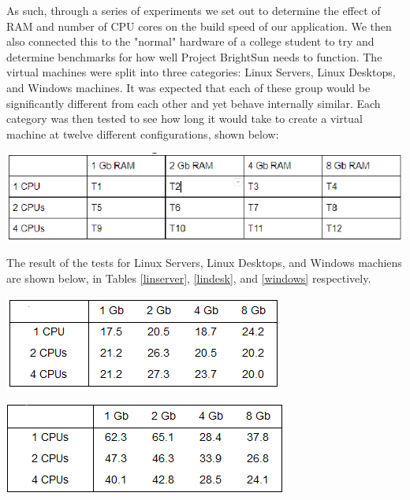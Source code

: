 \documentclass[openright]{report}
\begin{document}
\par As such, through a series of experiments we set out to determine the effect of RAM and number of CPU cores on the build speed of our application. We then also connected this to the "normal" hardware of a college student to try and determine benchmarks for how well Project BrightSun needs to function. The virtual machines were split into three categories: Linux Servers, Linux Desktops, and Windows machines. It was expected that each of these group would be significantly different from each other and yet behave internally similar. Each category was then tested to see how long it would take to create a virtual machine at twelve different configurations, shown below:

\begin{center}
    \includegraphics[scale=0.80]{images/tablesum.png}
\end{center}

The result of the tests for Linux Servers, Linux Desktops, and Windows machiens are shown below, in Tables \ref{linserver}, \ref{lindesk}, and \ref{windows} respectively.

\begin{center}
    \includegraphics[scale=0.90]{DocumentationAndReports/Reports/images/linserver.png}
    \label{linserver}
\end{center}

\begin{center}
    \includegraphics[scale=0.90]{DocumentationAndReports/Reports/images/lindesk.png}
    \label{lindesk}
\end{center}
\end{document}
